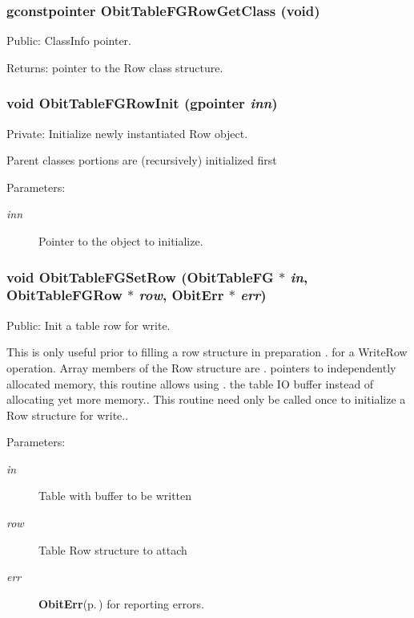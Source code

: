 \subsubsection{\setlength{\rightskip}{0pt plus 5cm}gconstpointer Obit\-Table\-FGRow\-Get\-Class (void)}\label{ObitTableFG_8c_a15}


Public: Class\-Info pointer. 

\begin{Desc}
\item[Returns:]pointer to the Row class structure. \end{Desc}
\subsubsection{\setlength{\rightskip}{0pt plus 5cm}void Obit\-Table\-FGRow\-Init (gpointer {\em inn})}\label{ObitTableFG_8c_a6}


Private: Initialize newly instantiated Row object. 

Parent classes portions are (recursively) initialized first \begin{Desc}
\item[Parameters:]
\begin{description}
\item[{\em inn}]Pointer to the object to initialize. \end{description}
\end{Desc}
\subsubsection{\setlength{\rightskip}{0pt plus 5cm}void Obit\-Table\-FGSet\-Row ({\bf Obit\-Table\-FG} $\ast$ {\em in}, {\bf Obit\-Table\-FGRow} $\ast$ {\em row}, {\bf Obit\-Err} $\ast$ {\em err})}\label{ObitTableFG_8c_a23}


Public: Init a table row for write. 

This is only useful prior to filling a row structure in preparation . for a Write\-Row operation. Array members of the Row structure are . pointers to independently allocated memory, this routine allows using . the table IO buffer instead of allocating yet more memory.. This routine need only be called once to initialize a Row structure for write.. \begin{Desc}
\item[Parameters:]
\begin{description}
\item[{\em in}]Table with buffer to be written \item[{\em row}]Table Row structure to attach \item[{\em err}]{\bf Obit\-Err}{\rm (p.\,\pageref{structObitErr})} for reporting errors. \end{description}
\end{Desc}
